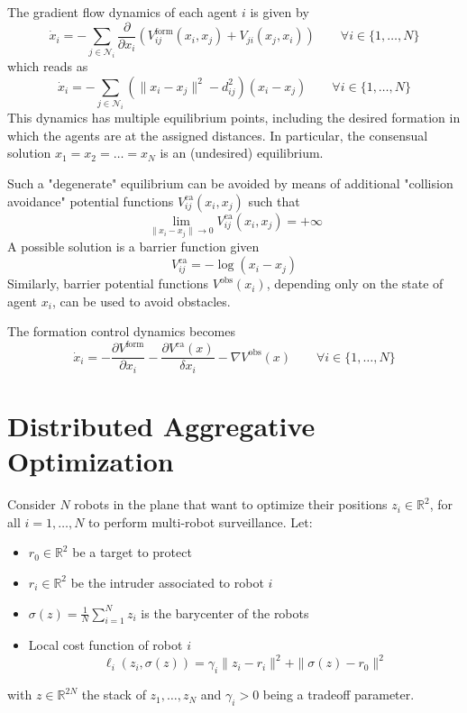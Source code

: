 \documentclass{book}
\newcommand{\R}{\mathbb{R}}
\theoremstyle{theoremv2}
\theoremstyle{defv2}
\theoremstyle{remark}
\theoremstyle{remark}
\theoremstyle{definition}
\theoremstyle{definition}
\begin{document}
 The gradient flow dynamics of each agent $i$ is given by 
 \[
     \dot{x}_i = - \displaystyle\sum_{j\in\mathcal{N}_i}\displaystyle\frac{\partial}{\partial x_i} \left(V_{ij}^\text{form}(x_i,x_j)+V_{ji}(x_j,x_i)\right) \qquad \forall i \in \{1,\dots,N\}
 \]
 which reads as 
 \[
     \dot{x}_i = - \displaystyle\sum_{j\in\mathcal{N}_i} \left(\|x_i-x_j\|^2-d_{ij}^2\right)(x_i-x_j) \qquad \forall i \in \{1,\dots,N\}
 \]
This dynamics has multiple equilibrium points, including the desired formation in which the agents are at the assigned distances. In particular, the consensual solution $x_1=x_2=\dots=x_N$ is an (undesired) equilibrium.

Such a "degenerate" equilibrium can be avoided by means of additional "collision avoidance" potential functions $V_{ij}^\text{ca}(x_i,x_j)$ such that 
\[
    \lim_{\|x_i-x_j\|\to 0} V_{ij}^\text{ca}(x_i,x_j)=+\infty
\]
A possible solution is a barrier function given 
\[
    V_{ij}^\text{ca} = -\log(x_i-x_j)
\]
Similarly, barrier potential functions $V^\text{obs}(x_i)$, depending only on the state of agent $x_i$, can be used to avoid obstacles. 

The formation control dynamics becomes 
\[
    \dot{x}_i = - \displaystyle\frac{\partial V^\text{form}}{\partial x_i} - \displaystyle\frac{\partial V^\text{ca}(x)}{\delta x_i} - \nabla V^\text{obs}(x) \qquad \forall i\in\{1,\dots,N\}
\]


\chapter{Distributed Aggregative Optimization}
Consider $N$ robots in the plane that want to optimize their positions $z_i\in\R^2$, for all $i=1,\dots,N$ to perform multi-robot surveillance. Let:
\begin{itemize}
    \item $r_0\in\R^2$ be a target to protect 
    \item $r_i\in\R^2$ be the intruder associated to robot $i$ 
    \item $\sigma(z) = \displaystyle\frac{1}{N}\displaystyle\sum_{i=1}^{N}z_i$ is the barycenter of the robots 
    \item Local cost function of robot $i$ 
        \[
            \ell_i(z_i,\sigma(z)) = \gamma_i\|z_i-r_i\|^2 + \|\sigma(z)-r_0\|^2
        \]
\end{itemize}
with $z\in\R^{2N}$ the stack of $z_1,\dots,z_N$ and $\gamma_i>0$ being a tradeoff parameter.
\end{document}
